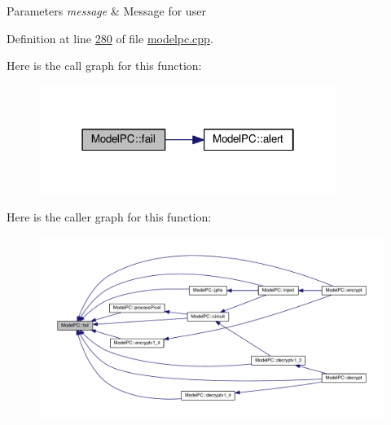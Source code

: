 \begin{DoxyParams}{Parameters}
{\em message} & Message for user \\
\hline
\end{DoxyParams}


Definition at line \hyperlink{modelpc_8cpp_source_l00280}{280} of file \hyperlink{modelpc_8cpp_source}{modelpc.\+cpp}.



Here is the call graph for this function\+:
\nopagebreak
\begin{figure}[H]
\begin{center}
\leavevmode
\includegraphics[width=274pt]{class_model_p_c_a47464b59b7e37fcee25e55475708aabd_cgraph}
\end{center}
\end{figure}




Here is the caller graph for this function\+:
\nopagebreak
\begin{figure}[H]
\begin{center}
\leavevmode
\includegraphics[width=350pt]{class_model_p_c_a47464b59b7e37fcee25e55475708aabd_icgraph}
\end{center}
\end{figure}



